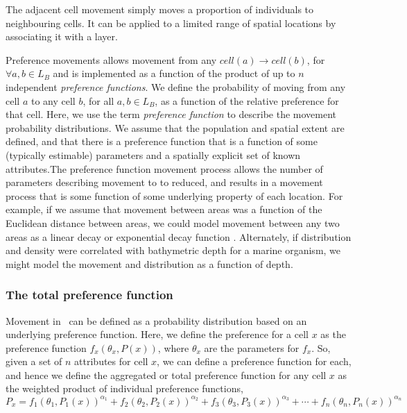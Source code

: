 The adjacent cell movement simply moves a proportion of individuals to neighbouring cells. It can be applied to a limited range of spatial locations by associating it with a layer.

Preference movements allows movement from any $cell(a) \rightarrow cell(b)$, for $\forall a,b \in L_B$ and is implemented as a function of the product of up to $n$ independent \emph{preference functions}. We define the probability of moving from any cell $a$ to any cell $b$, for all $a,b \in L_B$, as a function of the relative preference for that cell. Here, we use the term \emph{preference function} \citep{1366,1367} to describe the movement probability distributions. We assume that the population and spatial extent are defined, and that there is a preference function that is a function of some (typically estimable) parameters and a spatially explicit set of known attributes.The preference function movement process allows the number of parameters describing movement to to reduced, and results in a movement process that is some function of some underlying property of each location. For example, if we assume that movement between areas was a function of the Euclidean distance between areas, we could model movement between any two areas as a linear decay or exponential decay function \citep{1366}. Alternately, if distribution and density were correlated with bathymetric depth for a marine organism, we might model the movement and distribution as a function of depth. 

\subsubsection*{The total preference function}

Movement in \SPM\ can be defined as a probability distribution based on an underlying preference function. Here, we define the preference for a cell $x$ as the preference function $f_x(\theta_x,P(x))$, where $\theta_x$ are the parameters for $f_x$. So, given a set of $n$ attributes for cell $x$, we can define a preference function for each, and hence we define the aggregated or total preference function for any cell $x$ as the weighted product of individual preference functions,
\begin{equation}
  P_x=f_1(\theta_1,P_1(x))^{\alpha_1} + f_2(\theta_2,P_2(x))^{\alpha_2} + f_3(\theta_3,P_3(x))^{\alpha_3} + \cdots + f_n(\theta_n,P_n(x))^{\alpha_n}
\end{equation}

